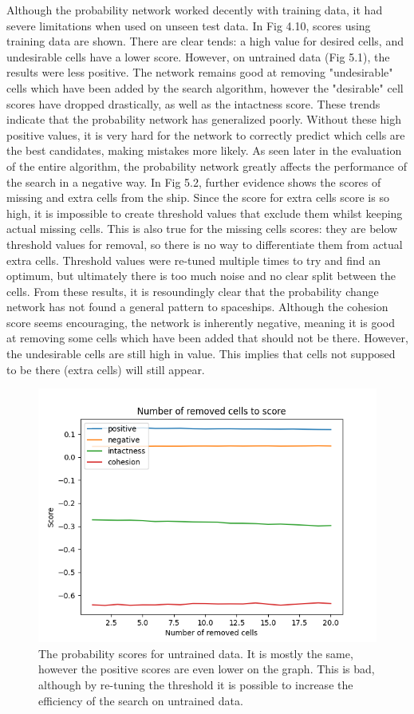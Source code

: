 \documentclass{l4proj}
\begin{document}
Although the probability network worked decently with training data, it had severe limitations when used on unseen test data. In Fig 4.10, scores using training data are shown. There are clear tends: a high value for desired cells, and undesirable cells have a lower score. However, on untrained data (Fig 5.1), the results were less positive. The network remains good at removing "undesirable" cells which have been added by the search algorithm, however the "desirable" cell scores have dropped drastically, as well as the intactness score. These trends indicate that the probability network has generalized poorly. Without these high positive values, it is very hard for the network to correctly predict which cells are the best candidates, making mistakes more likely. As seen later in the evaluation of the entire algorithm, the probability network greatly affects the performance of the search in a negative way. In Fig 5.2, further evidence shows the scores of missing and extra cells from the ship. Since the score for extra cells score is so high, it is impossible to create threshold values that exclude them whilst keeping actual missing cells. This is also true for the missing cells scores: they are below threshold values for removal, so there is no way to differentiate them from actual extra cells. Threshold values were re-tuned multiple times to try and find an optimum, but ultimately there is too much noise and no clear split between the cells. From these results, it is resoundingly clear that the probability change network has not found a general pattern to spaceships. Although the cohesion score seems encouraging, the network is inherently negative, meaning it is good at removing some cells which have been added that should not be there. However, the undesirable cells are still high in value. This implies that cells not supposed to be there (extra cells) will still appear.


\begin{figure}[h!]
\centering
\includegraphics[width=0.7\linewidth]{dissertation/images/graphs/n_removed_cells_score_probability_analysis_test.png}
\caption{The probability scores for untrained data. It is mostly the same, however the positive scores are even lower on the graph. This is bad, although by re-tuning the threshold it is possible to increase the efficiency of the search on untrained data.}
\label{fig:subim1}
\end{figure}
\end{document}
